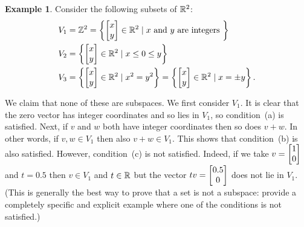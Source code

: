 \documentclass[reqno]{amsart}
\theoremstyle{definition}
\newtheorem{example}[theorem]{Example}
\begin{document}
\begin{example}
 Consider the following subsets of ${\mathbb{R}}^2$:
 \begin{align*}
  V_1 &= {\mathbb{Z}}^2 =
  \left\{\left[\begin{matrix} x\\ y\end{matrix}\right]\in{\mathbb{R}}^2\;|\; x \text{ and } y \text{ are integers }\right\} \\
  V_2 &= \left\{\left[\begin{matrix} x\\ y\end{matrix}\right]\in{\mathbb{R}}^2\;|\; x\leq 0\leq y\right\} \\
  V_3 &= \left\{\left[\begin{matrix} x\\ y\end{matrix}\right]\in{\mathbb{R}}^2\;|\; x^2=y^2\right\}
       = \left\{\left[\begin{matrix} x\\ y\end{matrix}\right]\in{\mathbb{R}}^2\;|\; x=\pm y\right\}.
 \end{align*}

 \bigskip

 \begin{center}
 \end{center}

 \bigskip

 We claim that none of these are subspaces.  We first consider $V_1$.
 It is clear that the zero vector has integer coordinates and so lies
 in $V_1$, so condition~(a) is satisfied.  Next, if $v$ and $w$ both have
 integer coordinates then so does $v+w$.  In other words, if
 $v,w\in V_1$ then also $v+w\in V_1$.  This shows that condition~(b)
 is also satisfied.  However, condition~(c) is not satisfied.  Indeed,
 if we take $v=\left[\begin{matrix} 1\\ 0\end{matrix}\right]$ and $t=0.5$ then $v\in V_1$ and
 $t\in{\mathbb{R}}$ but the vector $tv=\left[\begin{matrix} 0.5\\ 0\end{matrix}\right]$ does not lie in $V_1$.
 (This is generally the best way to prove that a set is not a
 subspace: provide a completely specific and explicit example where
 one of the conditions is not satisfied.)


\end{example}
\end{document}
